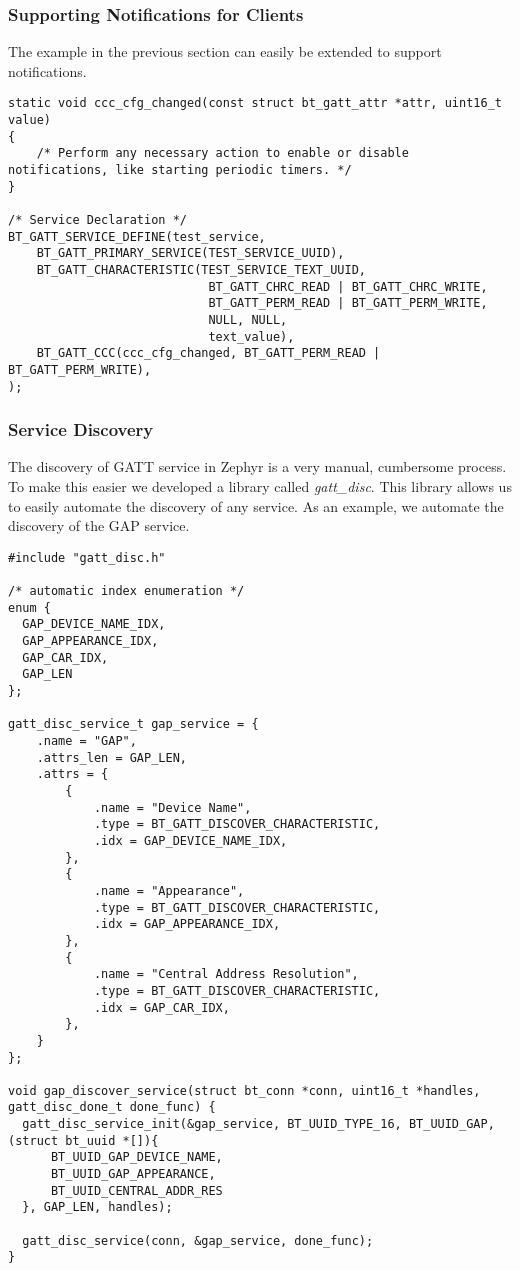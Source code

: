\subsubsection{Supporting Notifications for Clients}
The example in the previous section can easily be extended to support notifications.
\begin{lstlisting}
static void ccc_cfg_changed(const struct bt_gatt_attr *attr, uint16_t value)
{
    /* Perform any necessary action to enable or disable notifications, like starting periodic timers. */
}

/* Service Declaration */
BT_GATT_SERVICE_DEFINE(test_service,
    BT_GATT_PRIMARY_SERVICE(TEST_SERVICE_UUID),
    BT_GATT_CHARACTERISTIC(TEST_SERVICE_TEXT_UUID, 
                            BT_GATT_CHRC_READ | BT_GATT_CHRC_WRITE,
                            BT_GATT_PERM_READ | BT_GATT_PERM_WRITE,
                            NULL, NULL, 
                            text_value),
    BT_GATT_CCC(ccc_cfg_changed, BT_GATT_PERM_READ | BT_GATT_PERM_WRITE),
);
\end{lstlisting}

\subsubsection{Service Discovery}
The discovery of GATT service in Zephyr is a very manual, cumbersome process. To make this easier we developed a library called \textit{gatt\_disc}. This library allows us to easily automate the discovery of any service. As an example, we automate the discovery of the GAP service.

\begin{lstlisting}
#include "gatt_disc.h"

/* automatic index enumeration */
enum {
  GAP_DEVICE_NAME_IDX,
  GAP_APPEARANCE_IDX,
  GAP_CAR_IDX,
  GAP_LEN
};

gatt_disc_service_t gap_service = {
    .name = "GAP",
    .attrs_len = GAP_LEN,
    .attrs = {
        {
            .name = "Device Name",
            .type = BT_GATT_DISCOVER_CHARACTERISTIC,
            .idx = GAP_DEVICE_NAME_IDX,
        },
        {
            .name = "Appearance",
            .type = BT_GATT_DISCOVER_CHARACTERISTIC,
            .idx = GAP_APPEARANCE_IDX,
        },
        {
            .name = "Central Address Resolution",
            .type = BT_GATT_DISCOVER_CHARACTERISTIC,
            .idx = GAP_CAR_IDX,
        },
    }
};

void gap_discover_service(struct bt_conn *conn, uint16_t *handles, gatt_disc_done_t done_func) {
  gatt_disc_service_init(&gap_service, BT_UUID_TYPE_16, BT_UUID_GAP, (struct bt_uuid *[]){
      BT_UUID_GAP_DEVICE_NAME,
      BT_UUID_GAP_APPEARANCE,
      BT_UUID_CENTRAL_ADDR_RES
  }, GAP_LEN, handles);

  gatt_disc_service(conn, &gap_service, done_func);
}
\end{lstlisting}


